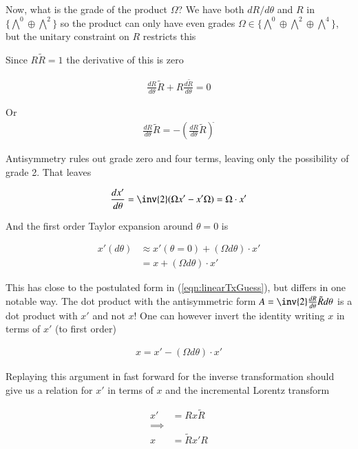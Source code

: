 Now, what is the grade of the product $\Omega$?  We have both $dR/d\theta$ and $R$ in $\{\bigwedge^0 \oplus \bigwedge^2\}$ so the product can only have even grades $\Omega \in \{\bigwedge^0 \oplus \bigwedge^2 \oplus \bigwedge^4\}$, but the unitary constraint on $R$ restricts this

Since $R \tilde{R} = 1$ the derivative of this is zero

\begin{align*}
\frac{dR}{d\theta} \tilde{R} + {R} \frac{d\tilde{R}}{d\theta}  = 0
\end{align*}

Or
\begin{align*}
\frac{dR}{d\theta} \tilde{R} = - \left( \frac{dR}{d\theta} \tilde{R} \right)^{\tilde{}}
\end{align*}

Antisymmetry rules out grade zero and four terms, leaving only the possibility of grade 2.  That leaves

\begin{align*}
\frac{dx'}{d\theta} = \inv{2}(\Omega x' - x' \Omega) = \Omega \cdot x'
\end{align*}

And the first order Taylor expansion around $\theta =0$ is

\begin{align*}
x'(d\theta) 
&\approx x'(\theta = 0) + ( \Omega d\theta ) \cdot x' \\
&= x + ( \Omega d\theta ) \cdot x'
\end{align*}

This has close to the postulated form in (\ref{eqn:linearTxGuess}), but differs in one notable way.  The dot product with the antisymmetric form $A = \inv{2} \frac{dR}{d\theta} \tilde{R} d\theta$ is a dot product with $x'$ and not $x$!  One can however invert the identity writing $x$ in terms of $x'$ (to first order)

\begin{align*}
x = x' - ( \Omega d\theta ) \cdot x'
\end{align*}

Replaying this argument in fast forward for the inverse transformation should give us a relation for $x'$ in terms of $x$ and the incremental Lorentz transform

\begin{align*}
x' &= R x \tilde{R} \\
\implies \\
x &= \tilde{R} x' {R} \\
\end{align*}

